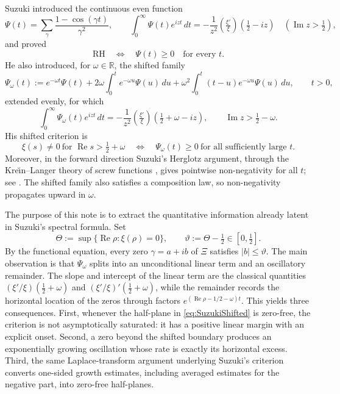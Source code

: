 \documentclass[11pt,reqno]{amsart}
\theoremstyle{plain}
\theoremstyle{definition}
\newcommand{\R}{\mathbb{R}}
\newcommand{\Rp}{\operatorname{Re}}
\newcommand{\Ip}{\operatorname{Im}}
\newcommand{\lxi}[1]{\left(\tfrac{\xi'}{\xi}\right)\!#1}
\begin{document}
Suzuki \cite{Suzuki2023} introduced the continuous even function
\begin{equation}\label{eq:PsiTwoFaces}
 \Psi(t)=\sum_\gamma\frac{1-\cos(\gamma t)}{\gamma^2},
 \qquad
 \int_0^\infty \Psi(t)e^{izt}\,dt
 =-\frac1{z^2}\lxi{\left(\tfrac12-iz\right)}
 \quad (\Ip z>\tfrac12),
\end{equation}
and proved
\begin{equation}\label{eq:SuzukiRH}
 \mathrm{RH}\quad\Longleftrightarrow\quad \Psi(t)\ge0\quad\text{for every }t.
\end{equation}
He also introduced, for $\omega\in\R$, the shifted family
\begin{equation}\label{eq:Psiomegadef}
 \Psi_\omega(t)
 :=e^{-\omega t}\Psi(t)
 +2\omega\int_0^t e^{-\omega u}\Psi(u)\,du
 +\omega^2\int_0^t(t-u)e^{-\omega u}\Psi(u)\,du,
 \qquad t>0,
\end{equation}
extended evenly, for which
\begin{equation}\label{eq:PsiomegaLaplace}
 \int_0^\infty\Psi_\omega(t)e^{izt}\,dt
 =-\frac1{z^2}\lxi{\left(\tfrac12+\omega-iz\right)},
 \qquad \Ip z>\tfrac12-\omega.
\end{equation}
His shifted criterion is
\begin{equation}\label{eq:SuzukiShifted}
 \xi(s)\ne0\ \text{for }\Rp s>\tfrac12+\omega
 \quad\Longleftrightarrow\quad
 \Psi_\omega(t)\ge0\ \text{for all sufficiently large }t.
\end{equation}
Moreover, in the forward direction Suzuki's Herglotz argument, through the Kre\u\i n--Langer
theory of screw functions \cite{KreinLanger}, gives pointwise non-negativity for
all $t$; see \cite[\S11]{Suzuki2023}.  The shifted family also satisfies a composition law, so
non-negativity propagates upward in $\omega$.

The purpose of this note is to extract the quantitative information already latent in Suzuki's
spectral formula.  Set
\[
 \Theta:=\sup\{\Rp\rho:\xi(\rho)=0\},
 \qquad \vartheta:=\Theta-\tfrac12\in[0,\tfrac12].
\]
By the functional equation, every zero $\gamma=a+ib$ of $\Xi$ satisfies $|b|\le\vartheta$.
The main observation is that $\Psi_\omega$ splits into an unconditional linear term and an
oscillatory remainder.  The slope and intercept of the linear term are the classical quantities
$(\xi'/\xi)(\tfrac12+\omega)$ and $(\xi'/\xi)'(\tfrac12+\omega)$, while the remainder records the
horizontal location of the zeros through factors $e^{(\Rp\rho-1/2-\omega)t}$.  This yields three
consequences.  First, whenever the half-plane in \eqref{eq:SuzukiShifted} is zero-free, the
criterion is not asymptotically saturated: it has a positive linear margin with an explicit onset.
Second, a zero beyond the shifted boundary produces an exponentially growing oscillation whose
rate is exactly its horizontal excess.  Third, the same Laplace-transform argument underlying
Suzuki's criterion converts one-sided growth estimates, including averaged estimates for the
negative part, into zero-free half-planes.
\end{document}
